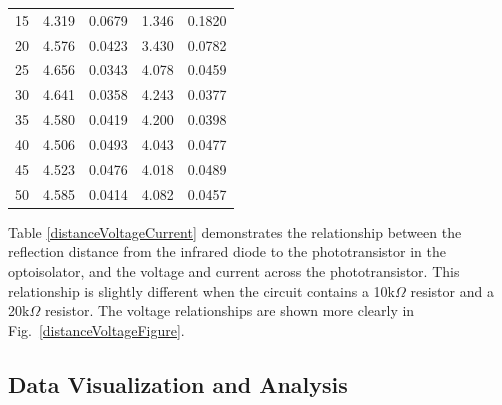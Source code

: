 \documentclass[conference]{IEEEtran}
\begin{document}
\begin{table}[H]
\begin{tabular}{|c||c|c||c|c|}
        15 & 4.319 &  0.0679 & 1.346 & 0.1820 \\
        20 & 4.576 &  0.0423 & 3.430 & 0.0782 \\
        25 & 4.656 &  0.0343 & 4.078 & 0.0459 \\
        30 & 4.641 &  0.0358 & 4.243 & 0.0377 \\
        35 & 4.580 &  0.0419 & 4.200 & 0.0398 \\
        40 & 4.506 &  0.0493 & 4.043 & 0.0477 \\
        45 & 4.523 &  0.0476 & 4.018 & 0.0489 \\
        50 & 4.585 &  0.0414 & 4.082 & 0.0457 \\
        \hline
    \end{tabular}
\end{table}

Table \ref{distanceVoltageCurrent} demonstrates the relationship between the reflection distance
from the infrared diode to the phototransistor in the optoisolator, and the voltage and current across the
phototransistor. This relationship is slightly different when the circuit contains a 10k$\Omega$ resistor
and a 20k$\Omega$ resistor. The voltage relationships are shown more clearly in Fig.~\ref{distanceVoltageFigure}.

\subsection{Data Visualization and Analysis}
\end{document}
